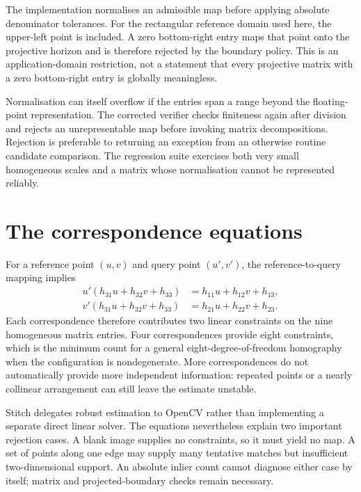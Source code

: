 The implementation normalises an admissible map before applying absolute denominator tolerances. For the rectangular reference domain used here, the upper-left point is included. A zero bottom-right entry maps that point onto the projective horizon and is therefore rejected by the boundary policy. This is an application-domain restriction, not a statement that every projective matrix with a zero bottom-right entry is globally meaningless.

Normalisation can itself overflow if the entries span a range beyond the floating-point representation. The corrected verifier checks finiteness again after division and rejects an unrepresentable map before invoking matrix decompositions. Rejection is preferable to returning an exception from an otherwise routine candidate comparison. The regression suite exercises both very small homogeneous scales and a matrix whose normalisation cannot be represented reliably.

\section{The correspondence equations}
For a reference point $(u,v)$ and query point $(u',v')$, the reference-to-query mapping implies
\begin{align}
 u'(h_{31}u+h_{32}v+h_{33})&=h_{11}u+h_{12}v+h_{13},\\
 v'(h_{31}u+h_{32}v+h_{33})&=h_{21}u+h_{22}v+h_{23}.
\end{align}
Each correspondence therefore contributes two linear constraints on the nine homogeneous matrix entries. Four correspondences provide eight constraints, which is the minimum count for a general eight-degree-of-freedom homography when the configuration is nondegenerate. More correspondences do not automatically provide more independent information: repeated points or a nearly collinear arrangement can still leave the estimate unstable.

Stitch delegates robust estimation to OpenCV rather than implementing a separate direct linear solver. The equations nevertheless explain two important rejection cases. A blank image supplies no constraints, so it must yield no map. A set of points along one edge may supply many tentative matches but insufficient two-dimensional support. An absolute inlier count cannot diagnose either case by itself; matrix and projected-boundary checks remain necessary.

